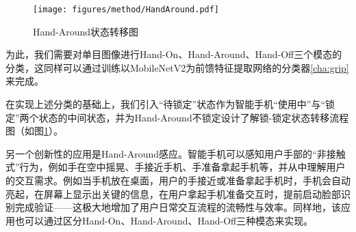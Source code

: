 \begin{figure}[h]
  \centering
  \texttt{[image: figures/method/HandAround.pdf]}
  \caption{Hand-Around状态转移图}
  \label{fig:hand_around}
\end{figure}

为此，我们需要对单目图像进行Hand-On、Hand-Around、Hand-Off三个模态的分类，这同样可以通过训练以MobileNetV2为前馈特征提取网络的分类器\ref{cha:grip}来完成。

在实现上述分类的基础上，我们引入“待锁定”状态作为智能手机“使用中”与“锁定”两个状态的中间状态，并为Hand-Around不锁定设计了解锁-锁定状态转移流程图（如图\ref{fig:hand_around}）。



另一个创新性的应用是Hand-Around感应。智能手机可以感知用户手部的“非接触式”行为，例如手在空中摇晃、手接近手机、手准备拿起手机等，并从中理解用户的交互需求。例如当手机放在桌面，用户的手接近或准备拿起手机时，手机会自动亮起，在屏幕上显示出关键的信息，在用户拿起手机准备交互时，提前启动脸部识别完成验证——这极大地增加了用户日常交互流程的流畅性与效率。同样地，该应用也可以通过区分Hand-On、Hand-Around、Hand-Off三种模态来实现。


